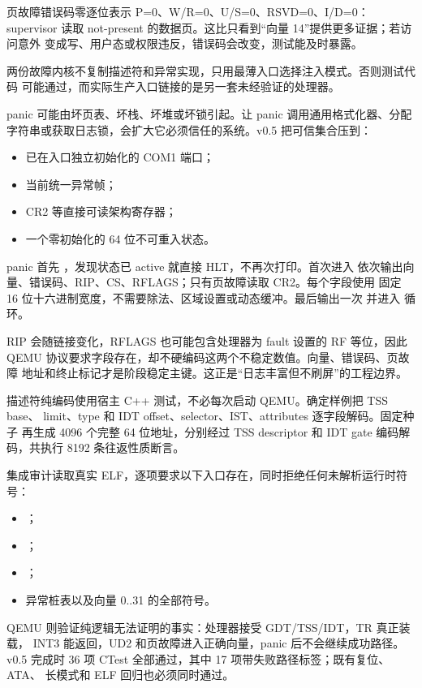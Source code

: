 页故障错误码零逐位表示 P=0、W/R=0、U/S=0、RSVD=0、I/D=0：supervisor
读取 not-present 的数据页。这比只看到“向量 14”提供更多证据；若访问意外
变成写、用户态或权限违反，错误码会改变，测试能及时暴露。

两份故障内核不复制描述符和异常实现，只用最薄入口选择注入模式。否则测试代码
可能通过，而实际生产入口链接的是另一套未经验证的处理器。

panic 可能由坏页表、坏栈、坏堆或坏锁引起。让 panic 调用通用格式化器、分配
字符串或获取日志锁，会扩大它必须信任的系统。v0.5 把可信集合压到：

\begin{itemize}
  \item 已在入口独立初始化的 COM1 端口；
  \item 当前统一异常帧；
  \item CR2 等直接可读架构寄存器；
  \item 一个零初始化的 64 位不可重入状态。
\end{itemize}

panic 首先 ，发现状态已 active 就直接 HLT，不再次打印。首次进入
依次输出向量、错误码、RIP、CS、RFLAGS；只有页故障读取 CR2。每个字段使用
固定 16 位十六进制宽度，不需要除法、区域设置或动态缓冲。最后输出一次
 并进入  循环。

RIP 会随链接变化，RFLAGS 也可能包含处理器为 fault 设置的 RF 等位，因此
QEMU 协议要求字段存在，却不硬编码这两个不稳定数值。向量、错误码、页故障
地址和终止标记才是阶段稳定主键。这正是“日志丰富但不刷屏”的工程边界。

描述符纯编码使用宿主 C++ 测试，不必每次启动 QEMU。确定样例把 TSS base、
limit、type 和 IDT offset、selector、IST、attributes 逐字段解码。固定种子
 再生成 4096 个完整 64 位地址，分别经过 TSS
descriptor 和 IDT gate 编码解码，共执行 8192 条往返性质断言。

集成审计读取真实 ELF，逐项要求以下入口存在，同时拒绝任何未解析运行时符号：
\begin{itemize}
  \item {}；
  \item {}；
  \item {}；
  \item 异常桩表以及向量 0..31 的全部符号。
\end{itemize}

QEMU 则验证纯逻辑无法证明的事实：处理器接受 GDT/TSS/IDT，TR 真正装载，
INT3 能返回，UD2 和页故障进入正确向量，panic 后不会继续成功路径。v0.5
完成时 36 项 CTest 全部通过，其中 17 项带失败路径标签；既有复位、ATA、
长模式和 ELF 回归也必须同时通过。

